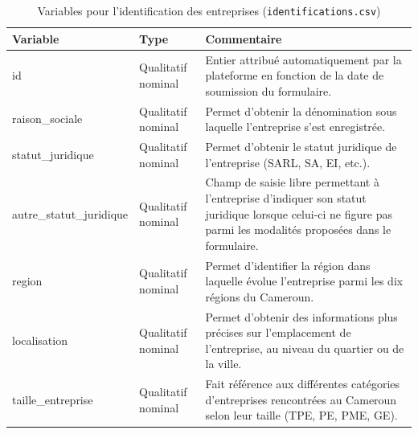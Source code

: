 \documentclass[12pt, a4paper, oneside]{report}
\begin{document}
	\begin{table}[H]
		\centering
		\caption{Variables pour l'identification des entreprises
			(\texttt{identifications.csv})}
		\label{tab:var_identification}
		\renewcommand{\arraystretch}{1.5}
		\begin{tabularx}{\textwidth}{
				>{\ttfamily\raggedright\arraybackslash}p{3.8cm}
				>{\raggedright\arraybackslash}p{2.8cm}
				>{\raggedright\arraybackslash}X}
			
			\toprule
			\rowcolor{primary!15}
			\textbf{Variable} & \textbf{Type} & \textbf{Commentaire} \\
			\midrule
			
			id
			& Qualitatif nominal
			& Entier attribué automatiquement par la plateforme en fonction
			de la date de soumission du formulaire. \\
			
			\rowcolor{lightgray}
			raison\_sociale
			& Qualitatif nominal
			& Permet d'obtenir la dénomination sous laquelle l'entreprise
			s'est enregistrée. \\
			
			statut\_juridique
			& Qualitatif nominal
			& Permet d'obtenir le statut juridique de l'entreprise
			(SARL, SA, EI, etc.). \\
			
			\rowcolor{lightgray}
			autre\_statut\_juridique
			& Qualitatif nominal
			& Champ de saisie libre permettant à l'entreprise d'indiquer
			son statut juridique lorsque celui-ci ne figure pas parmi
			les modalités proposées dans le formulaire. \\
			
			region
			& Qualitatif nominal
			& Permet d'identifier la région dans laquelle évolue
			l'entreprise parmi les dix régions du Cameroun. \\
			
			\rowcolor{lightgray}
			localisation
			& Qualitatif nominal
			& Permet d'obtenir des informations plus précises sur
			l'emplacement de l'entreprise, au niveau du quartier
			ou de la ville. \\
			
			taille\_entreprise
			& Qualitatif nominal
			& Fait référence aux différentes catégories d'entreprises
			rencontrées au Cameroun selon leur taille
			(TPE, PE, PME, GE). \\
			

\end{tabularx}
\end{table}
\end{document}
